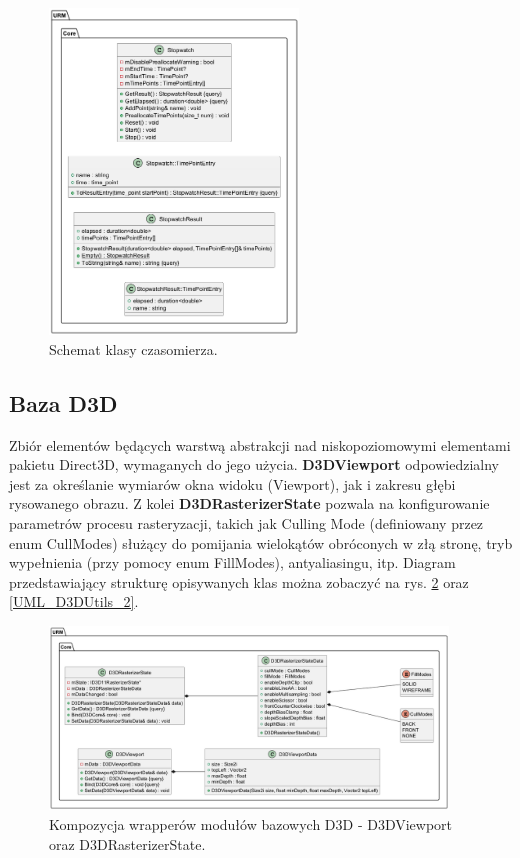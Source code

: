 	\begin{figure}[h!]
		\centering
		\includegraphics[width=250px]{images/UML/stopwatch.png}
		\caption{Schemat klasy czasomierza.}
		\label{UML_Stopwatch}
	\end{figure}
	
\subsection{Baza D3D}
	Zbiór elementów będących warstwą abstrakcji nad niskopoziomowymi elementami pakietu Direct3D, wymaganych do jego użycia.
	\textbf{D3DViewport} odpowiedzialny jest za określanie wymiarów okna widoku (Viewport), jak i zakresu głębi rysowanego obrazu.
	Z kolei \textbf{D3DRasterizerState} pozwala na konfigurowanie parametrów procesu rasteryzacji, takich jak Culling Mode (definiowany przez enum CullModes) służący do pomijania wielokątów obróconych w złą stronę, tryb wypełnienia (przy pomocy enum FillModes), antyaliasingu, itp.
	Diagram przedstawiający strukturę opisywanych klas można zobaczyć na rys. \ref{UML_D3DUtils_1} oraz \ref{UML_D3DUtils_2}.
	
	\begin{figure}[h!]
		\centering
		\includegraphics[width=400px]{images/UML/d3dutils_1.png}
		\caption{Kompozycja wrapperów modułów bazowych D3D - D3DViewport oraz D3DRasterizerState.}
		\label{UML_D3DUtils_1}
	\end{figure}
	
